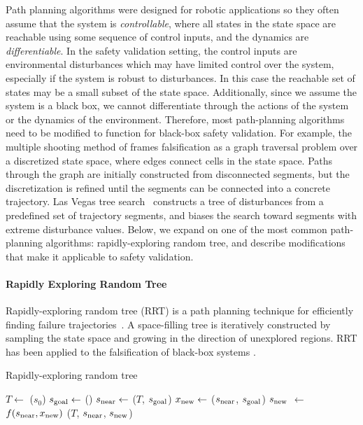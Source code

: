 Path planning algorithms were designed for robotic applications so they often assume that the system is \emph{controllable}, where all states in the state space are reachable using some sequence of control inputs, and the dynamics are \emph{differentiable}. In the safety validation setting, the control inputs are environmental disturbances which may have limited control over the system, especially if the system is robust to disturbances. In this case the reachable set of states may be a small subset of the state space. Additionally, since we assume the system is a black box, we cannot differentiate through the actions of the system or the dynamics of the environment. Therefore, most path-planning algorithms need to be modified to function for black-box safety validation. For example, the multiple shooting method of \textcite{zutshi2014multiple} frames falsification as a graph traversal problem over a discretized state space, where edges connect cells in the state space. Paths through the graph are initially constructed from disconnected segments, but the discretization is refined until the segments can be connected into a concrete trajectory. Las Vegas tree search~\cite{ernst2019fast} constructs a tree of disturbances from a predefined set of trajectory segments, and biases the search toward segments with extreme disturbance values. Below, we expand on one of the most common path-planning algorithms: rapidly-exploring random tree, and describe modifications that make it applicable to safety validation. 

\paragraph{Rapidly Exploring Random Tree} Rapidly-exploring random tree (RRT) is a path planning technique for efficiently finding failure trajectories~\cite{lavalle1998rapidly}. A space-filling tree is iteratively constructed by sampling the state space and growing in the direction of unexplored regions. RRT has been applied to the falsification of black-box systems \cite{esposito2004adaptive,kim2005rrt,branicky2006sampling,dang2008sensitive,Nahhal2007Test,plaku2009hybrid,dreossi2015efficient,tuncali2019rapidly,koschi2019computationally}.

\begin{algorithm}
\caption{Rapidly-exploring random tree} \label{alg:rrt}
\begin{algorithmic}[1]
    \State $T \gets$ ($s_0$)
    \Loop
        \State $s_{\rm goal} \gets$ () \label{line:rrt_sample_state}
        \State $s_{\rm near} \gets$ ($T$, $s_{\rm goal}$) \label{line:rrt_nearest_neighbor}
        \State $x_{\rm new} \gets $ ($s_{\rm near}$, $s_{\rm goal}$) \label{line:rrt_optimal_input}
        \State $s_{\rm new}$ $\gets$ $f(s_{\rm near}, x_{\rm new})$ \label{line:rrt_simulate}
        \State {}($T$, $s_{\rm near} $, $s_{\rm new}$) \label{line:rrt_add_new}
    \EndLoop
    \State {}
    \EndFunction
\end{algorithmic}
\end{algorithm}

